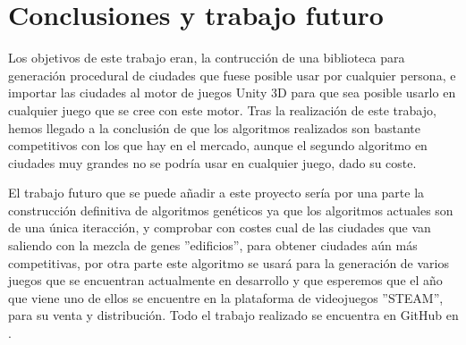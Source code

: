 \chapter[Conclusiones y trabajo futuro]{\label{identificadorReferenciaCruzada}
Conclusiones y trabajo futuro}


Los objetivos de este trabajo eran, la contrucción de una biblioteca para generación procedural de ciudades que fuese posible usar por cualquier persona, e importar las ciudades al motor de juegos Unity 3D para que sea posible usarlo en cualquier juego que se cree con este motor. Tras la realización de este trabajo, hemos llegado a la conclusión de que los algoritmos realizados son bastante competitivos con los que hay en el mercado, aunque el segundo algoritmo en ciudades muy grandes no se podría usar en cualquier juego, dado su coste. 

El trabajo futuro que se puede añadir a este proyecto sería por una parte la construcción definitiva de algoritmos genéticos ya que los algoritmos actuales son de una única iteracción, y comprobar con costes cual de las ciudades que van saliendo con la mezcla de genes ''edificios'', para obtener ciudades aún más competitivas, por otra parte este algoritmo se usará para la generación de varios juegos que se encuentran actualmente en desarrollo y que esperemos que el año que viene uno de ellos se encuentre en la plataforma de videojuegos ''STEAM'', para su venta y distribución. Todo el trabajo realizado se encuentra en GitHub en \cite{B13}.
